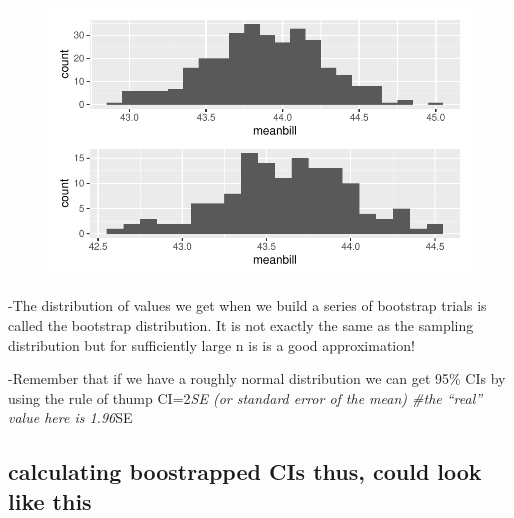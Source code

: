 \documentclass[
  letterpaper,
  DIV=11,
  numbers=noendperiod]{scrartcl}
\begin{document}
\begin{figure}[H]

{\centering \includegraphics{CIs_files/figure-pdf/unnamed-chunk-7-3.pdf}

}

\end{figure}

-The distribution of values we get when we build a series of bootstrap
trials is called the bootstrap distribution. It is not exactly the same
as the sampling distribution but for sufficiently large n is is a good
approximation!

-Remember that if we have a roughly normal distribution we can get 95\%
CIs by using the rule of thump CI=2\emph{SE (or standard error of the
mean) \#the ``real'' value here is 1.96}SE

\hypertarget{calculating-boostrapped-cis-thus-could-look-like-this}{%
\subsection{calculating boostrapped CIs thus, could look like
this}\label{calculating-boostrapped-cis-thus-could-look-like-this}}
\end{document}
